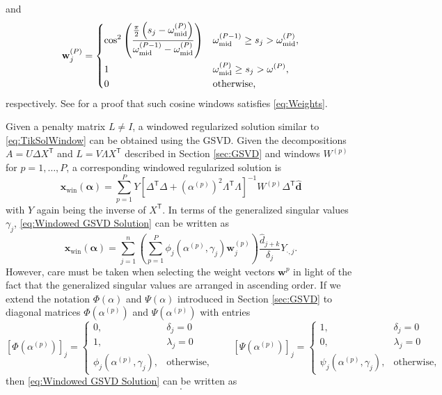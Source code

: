 \documentclass[12pt]{article}
\newcommand{\dVec}{\mathbf{d}}	%
\newcommand{\xVec}{\mathbf{x}}	%
\newcommand{\wVec}{\mathbf{w}}	%
\newcommand{\trans}[1]{{#1}^\mathsf{T}}	%
\newcommand{\inv}[1]{{#1}^{-1}}	%
\newcommand{\partition}{\omega}  %
\newcommand{\midpoint}{\partition_{\text{mid}}}   %
\newcommand{\dft}[1]{\widehat{#1}}	%
\newcommand{\regparam}{\alpha}  %
\newcommand{\regparamVec}{\bm{\regparam}}   %
\newcommand{\xWin}{\xVec_{\text{win}}}	%
\newcommand{\filt}{\phi}
\newcommand{\mfilt}{\psi}
\newcommand{\singular}{s}	%
\begin{document}
and
\begin{equation}
\label{eq:Last cosine window}
    \wVec_j^{(P)} = \begin{dcases}
    \cos^2\left(\frac{\frac{\pi}{2}\left(\singular_j - \midpoint^{(P)}\right)}{\midpoint^{(P-1)} - \midpoint^{(P)}}\right) & \midpoint^{(P-1)} \geq \singular_j > \midpoint^{(P)}, \\
    1 & \midpoint^{(P)} \geq \singular_j > \omega^{(P)}, \\
    0 & \text{otherwise,}
    \end{dcases}
\end{equation}
respectively. See \cite{Byrne} for a proof that such cosine windows satisfies \eqref{eq:Weights}. \par
Given a penalty matrix $L \neq I$, a windowed regularized solution similar to \eqref{eq:TikSolWindow} can be obtained using the GSVD. Given the decompositions $A = U\Delta\trans{X}$ and $L = V\Lambda\trans{X}$ described in Section \ref{sec:GSVD} and windows $W^{(p)}$ for $p = 1,\ldots,P$, a corresponding windowed regularized solution is
\begin{equation}
\label{eq:Windowed GSVD Solution}
    \xWin(\regparamVec) = \sum_{p=1}^P Y\inv{\left[\trans{\Delta}\Delta + \left(\regparam^{(p)}\right)^2 \trans{\Lambda}\Lambda\right]}W^{(p)}\trans{\Delta}\dft{\dVec}
\end{equation}
with $Y$ again being the inverse of $\trans{X}$. In terms of the generalized singular values $\gamma_j$, \eqref{eq:Windowed GSVD Solution} can be written as
\begin{equation}
\label{eq:Windowed GSVD Solution Sum}
    \xWin(\regparamVec) = \sum_{j=1}^n \left(\sum_{p=1}^P \filt_j\left(\regparam^{(p)},\gamma_j\right)\wVec^{(p)}_{j}\right)  \frac{\dft{d}_{j+k}}{\delta_j} Y_{\cdot,j}.
\end{equation}
However, care must be taken when selecting the weight vectors $\wVec^{p}$ in light of the fact that the generalized singular values are arranged in ascending order. If we extend the notation $\Phi(\regparam)$ and $\Psi(\regparam)$ introduced in Section \ref{sec:GSVD} to diagonal matrices $\Phi\left(\regparam^{(p)}\right)$ and $\Psi\left(\regparam^{(p)}\right)$ with entries
\[\left[\Phi\left(\regparam^{(p)}\right)\right]_j = \begin{cases}
0, & \delta_j = 0 \\
1, & \lambda_j = 0 \\
\filt_j\left(\regparam^{(p)},\gamma_j\right), & \text{otherwise,}
\end{cases} \qquad
\left[\Psi\left(\regparam^{(p)}\right)\right]_j = \begin{cases}
1, & \delta_j = 0 \\
0, & \lambda_j = 0 \\
\mfilt_j\left(\regparam^{(p)},\gamma_j\right), & \text{otherwise,}
\end{cases}\]
then \eqref{eq:Windowed GSVD Solution} can be written as
\[.\]
\end{document}
